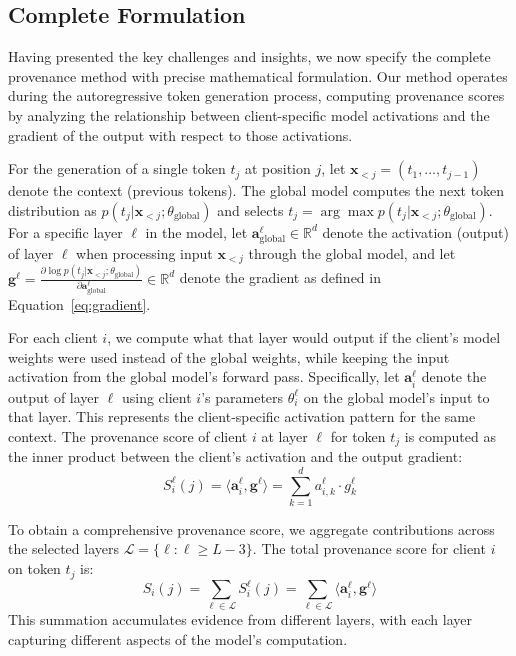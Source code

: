 \subsection{Complete Formulation}

Having presented the key challenges and insights, we now specify the complete provenance method with precise mathematical formulation. Our method operates during the autoregressive token generation process, computing provenance scores by analyzing the relationship between client-specific model activations and the gradient of the output with respect to those activations.

For the generation of a single token $t_j$ at position $j$, let $\mathbf{x}_{<j} = (t_1, \ldots, t_{j-1})$ denote the context (previous tokens). The global model computes the next token distribution as $p(t_j | \mathbf{x}_{<j}; \theta_{\text{global}})$ and selects $t_j = \arg\max p(t_j | \mathbf{x}_{<j}; \theta_{\text{global}})$. For a specific layer $\ell$ in the model, let $\mathbf{a}_{\text{global}}^\ell \in \mathbb{R}^d$ denote the activation (output) of layer $\ell$ when processing input $\mathbf{x}_{<j}$ through the global model, and let $\mathbf{g}^\ell = \frac{\partial \log p(t_j | \mathbf{x}_{<j}; \theta_{\text{global}})}{\partial \mathbf{a}_{\text{global}}^\ell} \in \mathbb{R}^d$ denote the gradient as defined in Equation~\ref{eq:gradient}.

For each client $i$, we compute what that layer would output if the client's model weights were used instead of the global weights, while keeping the input activation from the global model's forward pass. Specifically, let $\mathbf{a}_i^\ell$ denote the output of layer $\ell$ using client $i$'s parameters $\theta_i^\ell$ on the global model's input to that layer. This represents the client-specific activation pattern for the same context. The provenance score of client $i$ at layer $\ell$ for token $t_j$ is computed as the inner product between the client's activation and the output gradient:
\begin{equation}
\label{eq:layer-provenance}
S_i^{\ell}(j) = \langle \mathbf{a}_i^\ell, \mathbf{g}^\ell \rangle = \sum_{k=1}^d a_{i,k}^\ell \cdot g_k^\ell
\end{equation}

To obtain a comprehensive provenance score, we aggregate contributions across the selected layers $\mathcal{L} = \{\ell : \ell \geq L-3\}$. The total provenance score for client $i$ on token $t_j$ is:
\begin{equation}
\label{eq:token-provenance}
S_i(j) = \sum_{\ell \in \mathcal{L}} S_i^\ell(j) = \sum_{\ell \in \mathcal{L}} \langle \mathbf{a}_i^\ell, \mathbf{g}^\ell \rangle
\end{equation}
This summation accumulates evidence from different layers, with each layer capturing different aspects of the model's computation.

